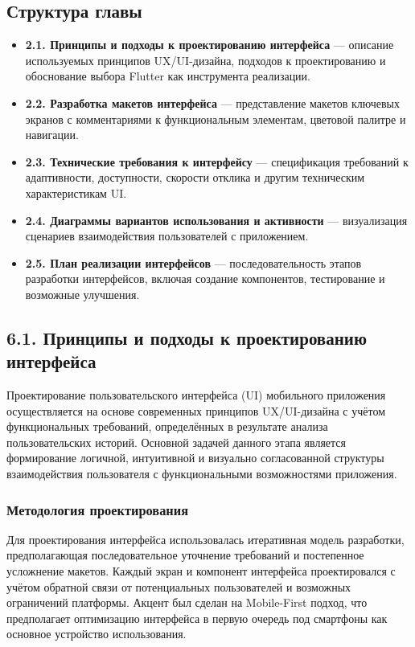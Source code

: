 \noindent \subsection*{Структура главы}
\begin{itemize}
    \item \textbf{2.1. Принципы и подходы к проектированию интерфейса} — описание используемых принципов UX/UI-дизайна, подходов к проектированию и обоснование выбора Flutter как инструмента реализации.
    \item \textbf{2.2. Разработка макетов интерфейса} — представление макетов ключевых экранов с комментариями к функциональным элементам, цветовой палитре и навигации.
    \item \textbf{2.3. Технические требования к интерфейсу} — спецификация требований к адаптивности, доступности, скорости отклика и другим техническим характеристикам UI.
    \item \textbf{2.4. Диаграммы вариантов использования и активности} — визуализация сценариев взаимодействия пользователей с приложением.
    \item \textbf{2.5. План реализации интерфейсов} — последовательность этапов разработки интерфейсов, включая создание компонентов, тестирование и возможные улучшения.
\end{itemize}

\noindent \subsection*{6.1. Принципы и подходы к проектированию интерфейса}
Проектирование пользовательского интерфейса (UI) мобильного приложения осуществляется на основе современных принципов UX/UI-дизайна с учётом функциональных требований, определённых в результате анализа пользовательских историй. Основной задачей данного этапа является формирование логичной, интуитивной и визуально согласованной структуры взаимодействия пользователя с функциональными возможностями приложения.

\subsubsection*{Методология проектирования}
Для проектирования интерфейса использовалась итеративная модель разработки, предполагающая последовательное уточнение требований и постепенное усложнение макетов. Каждый экран и компонент интерфейса проектировался с учётом обратной связи от потенциальных пользователей и возможных ограничений платформы. Акцент был сделан на Mobile-First подход, что предполагает оптимизацию интерфейса в первую очередь под смартфоны как основное устройство использования.

